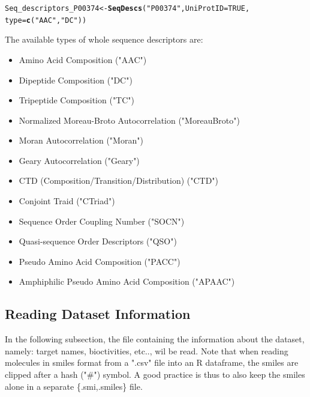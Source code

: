 \documentclass[twoside,a4wide,12pt]{article}\usepackage[]{graphicx}\usepackage[]{color}
\makeatletter
\newcommand{\hlnum}[1]{\textcolor[rgb]{0.686,0.059,0.569}{#1}}%
\newcommand{\hlstr}[1]{\textcolor[rgb]{0.192,0.494,0.8}{#1}}%
\newcommand{\hlstd}[1]{\textcolor[rgb]{0.345,0.345,0.345}{#1}}%
\newcommand{\hlkwb}[1]{\textcolor[rgb]{0.69,0.353,0.396}{#1}}%
\newcommand{\hlkwc}[1]{\textcolor[rgb]{0.333,0.667,0.333}{#1}}%
\newcommand{\hlkwd}[1]{\textcolor[rgb]{0.737,0.353,0.396}{\textbf{#1}}}%
\newenvironment{kframe}{%
 \def\at@end@of@kframe{}%
 \ifinner\ifhmode%
  \def\at@end@of@kframe{\end{minipage}}%
  \begin{minipage}{\columnwidth}%
 \fi\fi%
 \def\FrameCommand##1{\hskip\@totalleftmargin \hskip-\fboxsep
 \colorbox{shadecolor}{##1}\hskip-\fboxsep
     \hskip-\linewidth \hskip-\@totalleftmargin \hskip\columnwidth}%
 \MakeFramed {\advance\hsize-\width
   \@totalleftmargin\z@ \linewidth\hsize
   \@setminipage}}%
 {\par\unskip\endMakeFramed%
 \at@end@of@kframe}
\newenvironment{knitrout}{}{} %
\makeatother
\begin{document}
\begin{knitrout}
\color{fgcolor}\begin{kframe}
\begin{alltt}
\hlstd{Seq_descriptors_P00374} \hlkwb{<-} \hlkwd{SeqDescs}\hlstd{(}\hlstr{"P00374"}\hlstd{,} \hlkwc{UniProtID} \hlstd{=} \hlnum{TRUE}\hlstd{,}
    \hlkwc{type} \hlstd{=} \hlkwd{c}\hlstd{(}\hlstr{"AAC"}\hlstd{,} \hlstr{"DC"}\hlstd{))}
\end{alltt}
\end{kframe}
\end{knitrout}
The available types of whole sequence descriptors are:\cite{protr}
\begin{itemize}
\item Amino Acid Composition ("AAC")
\item Dipeptide Composition ("DC")
\item Tripeptide Composition ("TC")
\item Normalized Moreau-Broto Autocorrelation ("MoreauBroto")
\item Moran Autocorrelation ("Moran")
\item Geary Autocorrelation ("Geary")
\item  CTD (Composition/Transition/Distribution) ("CTD")
\item Conjoint Traid ("CTriad")
\item Sequence Order Coupling Number ("SOCN")
\item Quasi-sequence Order Descriptors ("QSO")
\item Pseudo Amino Acid Composition ("PACC")
\item Amphiphilic Pseudo Amino Acid Composition ("APAAC")
\end{itemize}

\subsection{Reading Dataset Information}
In the following subsection, 
the file containing the information about the dataset, namely: target names, bioctivities, etc.., wil be read.
Note that when reading molecules in smiles format from a ".csv" file into an R dataframe, the smiles are clipped after a hash ("\#") symbol.
A good practice is thus to also keep the smiles alone in a separate \{.smi,.smiles\} file.
\end{document}
